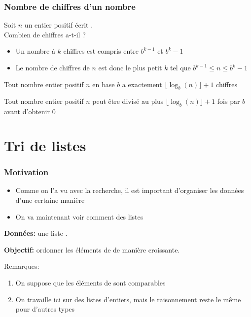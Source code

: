 \documentclass[12pt]{linfo-beamer}
\begin{document}
\begin{frame}
  \frametitle{Nombre de chiffres d'un nombre}

  Soit $n$ un entier positif écrit .\\
  Combien de chiffres a-t-il ?
  \begin{itemize}
  \item Un nombre à $k$ chiffres est compris entre $b^{k-1}$ et ${b^k}-1$
  \item Le nombre de chiffres de $n$ est donc le plus petit $k$ tel que $b^{k-1} \leq n \leq {b^k}-1$
  \end{itemize}

  \vfill

  \begin{beamerboxesrounded}{}
   Tout nombre entier positif $n$ en base $b$ a
  exactement $\lfloor \log_{b}(n) \rfloor + 1$ chiffres
  \end{beamerboxesrounded}

  \pause
  \vfill

  \begin{beamerboxesrounded}{}
   Tout nombre entier positif $n$ peut être
  divisé au plus $\lfloor \log_{b}(n) \rfloor + 1$ fois par $b$ avant
  d'obtenir $0$
  \end{beamerboxesrounded}

\end{frame}



\section{Tri de listes}

\begin{frame}
\frametitle{Motivation}
\begin{itemize}%
    \item Comme on l'a vu avec la recherche, il est important
      d'organiser les données d'une certaine manière
    \item On va maintenant voir comment  des listes
\end{itemize}
\begin{probleme}[tri]%
\textbf{Données:} une liste .

\textbf{Objectif:} ordonner les éléments de  de manière croissante.
\end{probleme}
Remarques:
\begin{enumerate}
\item On suppose que les éléments de  sont comparables
\item On travaille ici sur des listes d'entiers, mais le raisonnement reste le
même pour d'autres types
\end{enumerate}
\end{frame}
\end{document}
